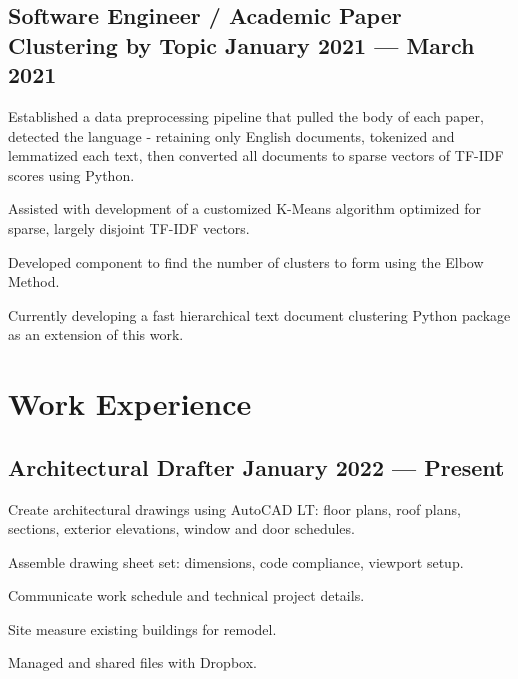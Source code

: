 \documentclass[letter,10pt]{article}
\begin{document}
\subsection{{Software Engineer / Academic Paper Clustering by Topic \hfill January 2021 --- March 2021}}
\begin{zitemize}
    \item Established a data preprocessing pipeline that pulled the body of each paper, detected the language - retaining only English documents, tokenized and lemmatized each text, then converted all documents to sparse vectors of TF-IDF scores using Python.
    \item Assisted with development of a customized K-Means algorithm optimized for sparse, largely disjoint TF-IDF vectors.
    \item Developed component to find the number of clusters to form using the Elbow Method.
    \item Currently developing a fast hierarchical text document clustering Python package as an extension of this work.
\end{zitemize}

\section{Work Experience}
\subsection{{Architectural Drafter \hfill January 2022 --- Present}}
\begin{zitemize}
    \item Create architectural drawings using AutoCAD LT: floor plans, roof plans, sections, exterior elevations, window and door schedules.
    \item Assemble drawing sheet set: dimensions, code compliance, viewport setup.
    \item Communicate work schedule and technical project details.
    \item Site measure existing buildings for remodel.
    \item Managed and shared files with Dropbox.
\end{zitemize}
\end{document}
